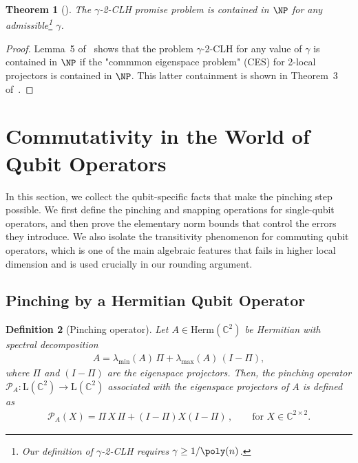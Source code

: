 \documentclass[11pt]{article}
\theoremstyle{plain}
\newtheorem{theorem}{Theorem}[section]
\newtheorem{definition}[theorem]{Definition}
\begin{document}
\begin{theorem}[\cite{bravyi2004commutativeversionklocalhamiltonian}]
\label{thm:clh-in-np}
    The $\gamma$-2-CLH promise problem is contained in $\NP$ for any admissible\footnote{Our definition of $\gamma$-2-CLH requires $\gamma \geq 1/\poly(n)$.} $\gamma$.
\end{theorem}
\begin{proof}
    Lemma~5 of~\cite{bravyi2004commutativeversionklocalhamiltonian} shows that the problem $\gamma$-2-CLH for any value of $\gamma$ is contained in $\NP$ if the "commmon eigenspace problem" (CES) for 2-local projectors is contained in $\NP$. This latter containment is shown in Theorem~3 of~\cite{bravyi2004commutativeversionklocalhamiltonian}.
\end{proof}


\section{Commutativity in the World of Qubit Operators}

In this section, we collect the qubit-specific facts that make the
pinching step possible.  We first define the pinching and snapping
operations for single-qubit operators, and then prove the elementary norm
bounds that control the errors they introduce.  We also isolate the
transitivity phenomenon for commuting qubit operators, which is one of the
main algebraic features that fails in higher local dimension and is used
crucially in our rounding argument.

\subsection{Pinching by a Hermitian Qubit Operator}

\begin{definition}[Pinching operator]\label{def:pinching-operator}
Let $A \in \mathrm{Herm}(\mathbb{C}^{2})$ be Hermitian with spectral decomposition 
\begin{align}
A = \lambda_{\min}(A)\,\Pi + \lambda_{\max}(A)\,(I-\Pi),
\end{align}
where $\Pi$ and $(I-\Pi)$ are the eigenspace projectors. Then, the pinching operator $\mathcal{P}_A: \mathrm{L}(\mathbb{C}^{2})\rightarrow \mathrm{L}(\mathbb{C}^{2})$ associated with the eigenspace projectors of $A$ is defined as
\begin{align}
    \mathcal{P}_A(X) = \Pi \, X \, \Pi + (I-\Pi) X (I-\Pi)\, , \quad\quad \text{for } X \in \mathbb{C}^{2 \times 2}.
    \end{align}
    
\end{definition}
\end{document}
